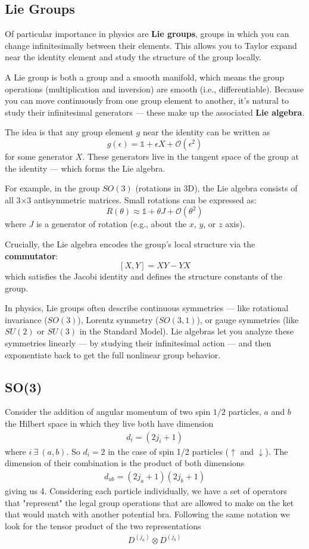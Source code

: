 \subsection{Lie Groups}

Of particular importance in physics are \textbf{Lie groups}, groups in which you can change infinitesimally between their elements. This allows you to Taylor expand near the identity element and study the structure of the group locally.

A Lie group is both a group and a smooth manifold, which means the group operations (multiplication and inversion) are smooth (i.e., differentiable). Because you can move continuously from one group element to another, it's natural to study their infinitesimal generators — these make up the associated \textbf{Lie algebra}.

The idea is that any group element $g$ near the identity can be written as
\[
g(\epsilon) = \mathbb{1} + \epsilon X + \mathcal{O}(\epsilon^2)
\]
for some generator $X$. These generators live in the tangent space of the group at the identity — which forms the Lie algebra.

For example, in the group $SO(3)$ (rotations in 3D), the Lie algebra consists of all 3×3 antisymmetric matrices. Small rotations can be expressed as:
\[
R(\theta) \approx \mathbb{1} + \theta J + \mathcal{O}(\theta^2)
\]
where $J$ is a generator of rotation (e.g., about the $x$, $y$, or $z$ axis).

Crucially, the Lie algebra encodes the group's local structure via the \textbf{commutator}:
\[
[X, Y] = XY - YX
\]
which satisfies the Jacobi identity and defines the structure constants of the group.

In physics, Lie groups often describe continuous symmetries — like rotational invariance ($SO(3)$), Lorentz symmetry ($SO(3,1)$), or gauge symmetries (like $SU(2)$ or $SU(3)$ in the Standard Model). Lie algebras let you analyze these symmetries linearly — by studying their infinitesimal action — and then exponentiate back to get the full nonlinear group behavior.

\subsection{SO(3)}
Consider the addition of angular momentum of two spin $1/2$ particles, $a$ and $b$ the Hilbert space in which they live both have dimension
\begin{align}
d_i = (2j_i + 1)
\end{align}
where $i ~\exists~(a,b)$. So $d_i = 2$ in the case of spin 1/2 particles ($\uparrow$ and $\downarrow$). The dimension of their combination is the product of both dimensions
\begin{align}
d_{ab} = (2j_a+1)(2j_b+1)
\end{align}
giving us 4. Considering each particle individually, we have a set of operators that "represent" the legal group operations that are allowed to make on the ket that would match with another potential bra. Following the same notation we look for the tensor product of the two representations
\begin{align}
D^{(j_a)}\otimes D^{(j_b)}
\end{align}

